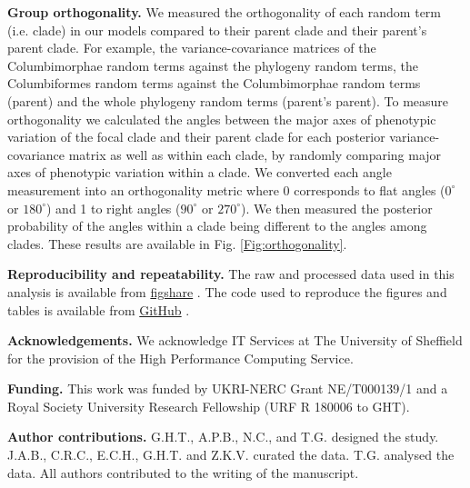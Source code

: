 \documentclass[12pt,letterpaper]{article}
\begin{document}
\textbf{Group orthogonality.}
We measured the orthogonality of each random term (i.e. clade) in our models compared to their parent clade and their parent's parent clade.
For example, the variance-covariance matrices of the Columbimorphae random terms against the phylogeny random terms, the Columbiformes random terms against the Columbimorphae random terms (parent) and the whole phylogeny random terms (parent's parent).
To measure orthogonality we calculated the angles between the major axes of phenotypic variation of the focal clade and their parent clade for each posterior variance-covariance matrix as well as within each clade, by randomly comparing major axes of phenotypic variation within a clade.
We converted each angle measurement into an orthogonality metric where 0 corresponds to flat angles ($0^\circ$ or  $180^\circ$) and 1 to right angles ($90^\circ$ or $270^\circ$).
We then measured the posterior probability of the angles within a clade being different to the angles among clades.
These results are available in Fig. \ref{Fig:orthogonality}.

\textbf{Reproducibility and repeatability.}
The raw and processed data used in this analysis is available from \href{https://figshare.shef.ac.uk/account/articles/21526146}{figshare} \cite{fighsaredata}.
The code used to reproduce the figures and tables is available from \href{https://github.com/TGuillerme/elaboration_exploration_bird_beaks}{GitHub} \cite{githubrepo}.

\textbf{Acknowledgements.}
We acknowledge IT Services at The University of Sheffield for the provision of the High Performance Computing Service.

\textbf{Funding.}
This work was funded by UKRI-NERC Grant NE/T000139/1 and a Royal Society University Research Fellowship (URF R 180006 to GHT).

\textbf{Author contributions.}
G.H.T., A.P.B., N.C., and T.G. designed the study. J.A.B., C.R.C., E.C.H., G.H.T. and Z.K.V. curated the data. T.G. analysed the data. All authors contributed to the writing of the manuscript.



\end{document}
